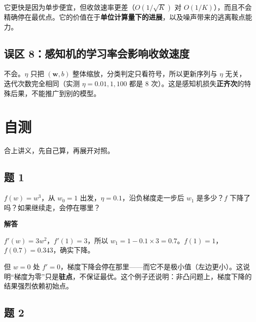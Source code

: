 \documentclass[UTF8, a4paper, zihao=-4, fontset=none]{ctexart}
\begin{document}
它更快是因为单步便宜，但收敛速率更差（$O(1/\sqrt{K})$ 对 $O(1/K)$），而且不会精确停在最优点。它的价值在于\textbf{单位计算量下的进展}，以及噪声带来的逃离鞍点能力。




\subsection*{误区 8：感知机的学习率会影响收敛速度}



不会。$\eta$ 只把 $(\mathbf{w},b)$ 整体缩放，分类判定只看符号，所以更新序列与 $\eta$ 无关，迭代次数完全相同（实测 $\eta=0.01,1,100$ 都是 8 次）。这是感知机损失\textbf{正齐次}的特殊后果，不能推广到别的模型。




\section{自测}



合上讲义，先自己算，再展开对照。




\subsection*{题 1}



$f(w)=w^3$，从 $w_0=1$ 出发，$\eta=0.1$，沿负梯度走一步后 $w_1$ 是多少？$f$ 下降了吗？如果继续走，会停在哪里？



\begin{answerbox}
{\bfseries\sffamily\small\color{accent} 解答}\par\vspace{2pt}
$f'(w)=3w^2$，$f'(1)=3$，所以 $w_1=1-0.1\times3=0.7$。$f(1)=1$，$f(0.7)=0.343$，确实下降。


但 $w=0$ 处 $f'=0$，梯度下降会停在那里——而它不是极小值（左边更小）。这说明“梯度为零”只是\textbf{驻点}，不保证最优。这个例子还说明：非凸问题上，梯度下降的结果强烈依赖初始点。


\end{answerbox}




\subsection*{题 2}
\end{document}
